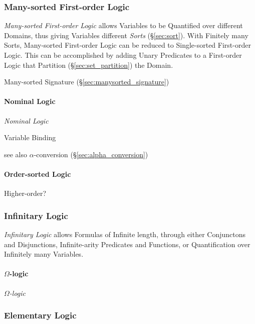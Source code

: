 \subsubsection{Many-sorted First-order Logic}
\label{sec:manysorted_logic}

\emph{Many-sorted First-order Logic} allows Variables to be Quantified
over different Domains, thus giving Variables different \emph{Sorts}
(\S\ref{sec:sort}). With Finitely many Sorts, Many-sorted First-order
Logic can be reduced to Single-sorted First-order Logic. This can be
accomplished by adding Unary Predicates to a First-order Logic that
Partition (\S\ref{sec:set_partition}) the Domain.

Many-sorted Signature (\S\ref{sec:manysorted_signature})



\paragraph{Nominal Logic}\label{sec:nominal_logic}\hfill
\emph{Nominal Logic}

Variable Binding

see also $\alpha$-conversion (\S\ref{sec:alpha_conversion})



\paragraph{Order-sorted Logic}\label{sec:order_sorted}\hfill

Higher-order?



\subsubsection{Infinitary Logic}\label{sec:infinitary_logic}

\emph{Infinitary Logic} allows Formulas of Infinite length, through
either Conjunctons and Disjunctions, Infinite-arity Predicates and
Functions, or Quantification over Infinitely many Variables.



\paragraph{$\Omega$-logic}\label{sec:omega_logic}\hfill

\emph{$\Omega$-logic}



\subsubsection{Elementary Logic}\label{sec:elementary_logic}


